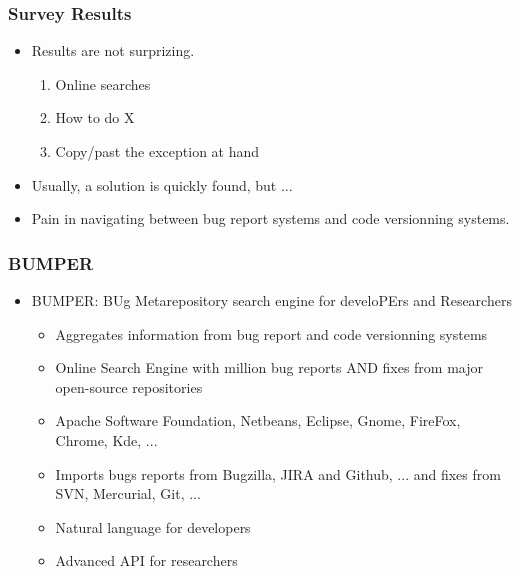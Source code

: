 \documentclass{beamer}
\begin{document}
\begin{frame}

  \frametitle{Survey Results}

\begin{itemize}
  \item Results are not surprizing.
  \begin{enumerate}
    \item Online searches
    \item How to do X
    \item Copy/past the exception at hand
  \end{enumerate}
  \item Usually, a solution is quickly found, but ...
  \item Pain in navigating between bug report systems and code versionning systems.
\end{itemize}

\end{frame}


\begin{frame}

\frametitle{BUMPER}
\begin{itemize}
\item BUMPER: BUg Metarepository search engine for develoPErs and Researchers
\begin{itemize}
\item Aggregates information from bug report and code versionning systems
\item Online Search Engine with million bug reports AND fixes from major open-source repositories
\item Apache Software Foundation, Netbeans, Eclipse, Gnome, FireFox, Chrome, Kde, ...
\item Imports bugs reports from Bugzilla, JIRA and Github, ... and fixes from SVN, Mercurial, Git, ...
\item Natural language for developers
\item Advanced API for researchers
\end{itemize}

\end{itemize}

\end{frame}
\end{document}
